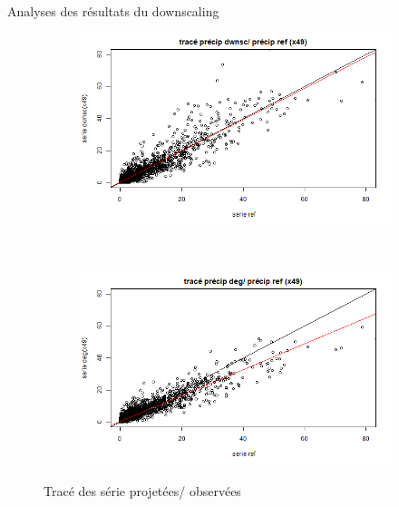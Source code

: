 \documentclass{beamer}
\numberwithin{equation}{section}
\begin{document}
\begin{frame}{Analyses des résultats du downscaling}
\begin{minipage}[b]{0.5\linewidth}
		\end{minipage}\hfill
		\begin{minipage}[b]{0.5\linewidth}
			\begin{figure}
				\centering
				\begin{subfigure}[b]{0.5\textwidth}
					\includegraphics[scale=0.2]{images/pr_3_CDFt_ref.png}
				\end{subfigure}\\
				\begin{subfigure}[b]{0.5\textwidth}
					\includegraphics[scale=0.2]{images/pr_3_dg.png}
				\end{subfigure}
			\caption{Tracé des série projetées/ observées}
			\end{figure}
		\end{minipage}
	\end{frame}
\end{document}
